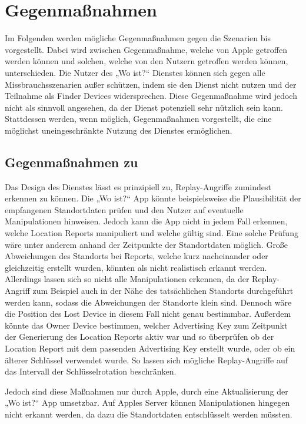 \section{Gegenmaßnahmen}
\label{sec:Gegenmassnahmen}

Im Folgenden werden mögliche Gegenmaßnahmen gegen die Szenarien  bis  vorgestellt.
Dabei wird zwischen Gegenmaßnahme, welche von Apple getroffen werden können und solchen, welche von den Nutzern getroffen werden können, unterschieden.
Die Nutzer des „Wo ist?“ Dienstes können sich gegen alle Missbrauchsszenarien außer  schützen, indem sie den Dienst nicht nutzen und der Teilnahme als Finder Devices widersprechen.
Diese Gegenmaßnahme wird jedoch nicht als sinnvoll angesehen, da der Dienst potenziell sehr nützlich sein kann.
Stattdessen werden, wenn möglich, Gegenmaßnahmen vorgestellt, die eine möglichst uneingeschränkte Nutzung des Dienstes ermöglichen.


\subsection{Gegenmaßnahmen zu }
Das Design des Dienstes lässt es prinzipiell zu, Replay-Angriffe zumindest erkennen zu können.
Die „Wo ist?“ App könnte beispielsweise die Plausibilität der empfangenen Standortdaten prüfen und den Nutzer auf eventuelle Manipulationen hinweisen.
Jedoch kann die App nicht in jedem Fall erkennen, welche Location Reports manipuliert und welche gültig sind.
Eine solche Prüfung wäre unter anderem anhand der Zeitpunkte der Standortdaten möglich.
Große Abweichungen des Standorts bei Reports, welche kurz nacheinander oder gleichzeitig erstellt wurden, könnten als nicht realistisch erkannt werden.
Allerdings lassen sich so nicht alle Manipulationen erkennen, da der Replay-Angriff zum Beispiel auch in der Nähe des tatsächlichen Standorts durchgeführt werden kann, sodass die Abweichungen der Standorte klein sind.
Dennoch wäre die Position des Lost Device in diesem Fall nicht genau bestimmbar.
Außerdem könnte das Owner Device bestimmen, welcher Advertising Key zum Zeitpunkt der Generierung des Location Reports aktiv war und so überprüfen ob der Location Report mit dem passenden Advertising Key erstellt wurde, oder ob ein älterer Schlüssel verwendet wurde.
So lassen sich mögliche Replay-Angriffe auf das Intervall der Schlüsselrotation beschränken.

Jedoch sind diese Maßnahmen nur durch Apple, durch eine Aktualisierung der „Wo ist?“ App umsetzbar. 
Auf Apples Server können Manipulationen hingegen nicht erkannt werden, da dazu die Standortdaten entschlüsselt werden müssten.

